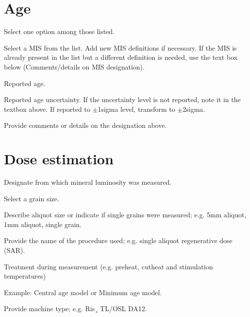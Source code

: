 \documentclass[letterpaper,10pt,english]{sphinxmanual}
\begin{document}
\section{Age}
\label{\detokenize{Luminescence:age}}
 \sphinxhyphen{} Select one option among those listed.

 \sphinxhyphen{} Select a MIS from the list. Add new MIS definitions if necessary. If the MIS is already present in the list but a different definition is needed, use the text box below (Comments/details on MIS designation).

 \sphinxhyphen{} Reported age.

 \sphinxhyphen{} Reported age uncertainty. If the uncertainty level is not reported, note it in the textbox above. If reported to \(\pm\)1\sphinxhyphen{}sigma level, transform to \(\pm\)2\sphinxhyphen{}sigma.

 \sphinxhyphen{} Provide comments or details on the designation above.


\section{Dose estimation}
\label{\detokenize{Luminescence:dose-estimation}}
 \sphinxhyphen{} Designate from which mineral luminosity was measured.

 \sphinxhyphen{} Select a grain size.

 \sphinxhyphen{} Describe aliquot size or indicate if single grains were measured; e.g. 5mm aliquot, 1mm aliquot, single grain.

 \sphinxhyphen{} Provide the name of the procedure used; e.g. single aliquot regenerative dose (SAR).

 \sphinxhyphen{} Treatment during measurement (e.g. preheat, cutheat and stimulation temperatures)

 \sphinxhyphen{} Example: Central age model or Minimum age model.

 \sphinxhyphen{} Provide machine type; e.g. Ris¸ TL/OSL DA\sphinxhyphen{}12.
\end{document}
